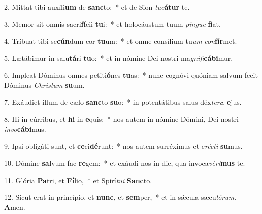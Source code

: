 2. Mittat tibi auxíli\textbf{um} de \textbf{sanc}to:~*  et de Sion \textit{tu}\textit{e}\textbf{á}\textbf{tur} te.\

3. Memor sit omnis sacri\textbf{fí}cii \textbf{tu}i:~*  et holocáustum tuum \textit{pin}\textit{gue} \textbf{fi}at.\

4. Tríbuat tibi se\textbf{cún}dum cor \textbf{tu}um:~*  et omne consílium tu\textit{um} \textit{con}\textbf{fír}met.\

5. Lætábimur in salu\textbf{tá}ri \textbf{tu}o:~*  et in nómine Dei nostri ma\textit{gni}\textit{fi}\textbf{cá}\textbf{bi}mur.\

6. Impleat Dóminus omnes petiti\textbf{ó}nes \textbf{tu}as:~*  nunc cognóvi quóniam salvum fecit Dóminus \textit{Chris}\textit{tum} \textbf{su}um.\

7. Exáudiet illum de cælo \textbf{sanc}to \textbf{su}o:~*  in potentátibus salus déx\textit{te}\textit{ræ} \textbf{e}jus.\

8. Hi in cúrribus, et \textbf{hi} in \textbf{e}quis:~*  nos autem in nómine Dómini, Dei nostri \textit{in}\textit{vo}\textbf{cá}\textbf{bi}mus.\

9. Ipsi obligáti sunt, et \textbf{ce}ci\textbf{dé}runt:~*  nos autem surréximus et e\textit{réc}\textit{ti} \textbf{su}mus.\

10. Dómine \textbf{sal}vum fac \textbf{re}gem:~*  et exáudi nos in die, qua invoca\textit{vé}\textit{ri}\textbf{mus} te.\

11. Glória \textbf{Pa}tri, et \textbf{Fí}lio,~*  et Spirí\textit{tu}\textit{i} \textbf{Sanc}to.\

12. Sicut erat in princípio, et \textbf{nunc}, et \textbf{sem}per,~*  et in sǽcula sæcu\textit{ló}\textit{rum}. \textbf{A}men.\

